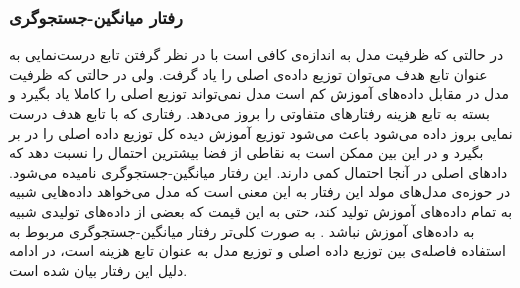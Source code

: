  \subsubsection{رفتار میانگین-جستجوگری}
 در حالتی که ظرفیت مدل به اندازه‌ی کافی است با در نظر گرفتن تابع درست‌نمایی به عنوان تابع هدف می‌توان توزیع داده‌ی اصلی را یاد گرفت. 
 ولی در حالتی که ظرفیت مدل در مقابل داده‌های آموزش کم است مدل نمی‌تواند توزیع اصلی را کاملا یاد بگیرد و بسته به تابع‌ هزینه رفتار‌های متفاوتی را بروز می‌دهد. رفتاری که با تابع هدف درست نمایی بروز داده می‌شود باعث می‌شود توزیع آموزش دیده کل توزیع داده اصلی را در بر بگیرد و در این بین ممکن است به نقاطی از فضا بیشترین احتمال را نسبت دهد که دادها‌ی اصلی در آنجا احتمال کمی دارند. 
 این رفتار میانگین-جستجوگری نامیده می‌شود.
 در حوزه‌ی مدل‌های مولد این رفتار به این معنی است که مدل می‌خواهد داده‌هایی شبیه به تمام داده‌های آموزش تولید کند، حتی به این قیمت که بعضی از داده‌های تولیدی شبیه به داده‌های آموزش نباشد
 \cite{Huszar15HowNot}.
 به صورت کلی‌تر رفتار میانگین-جستجوگری مربوط به استفاده فاصله‌ی 
 بین توزیع داده اصلی و توزیع مدل به عنوان تابع هزینه است، در ادامه دلیل این رفتار بیان شده است.
